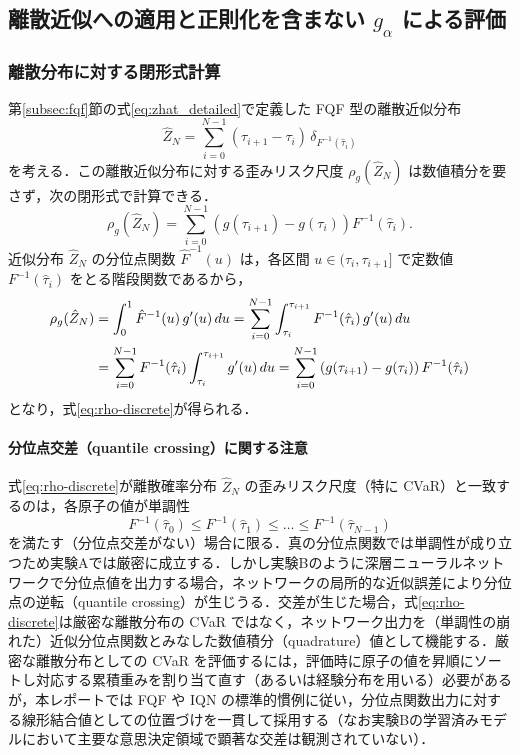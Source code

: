 \documentclass[a4paper,10pt]{jsarticle}
\theoremstyle{definition}
\renewcommand{\Finv}{F^{-1}}
\newcommand{\Fhinv}{\hat{F}^{-1}}
\begin{document}
\subsection{離散近似への適用と正則化を含まない $g_\alpha$ による評価}
\label{subsec:discrete-eval}

\subsubsection{離散分布に対する閉形式計算}
第\ref{subsec:fqf}節の式\eqref{eq:zhat_detailed}で定義した FQF 型の離散近似分布
\begin{equation}
  \hat Z_N = \sum_{i=0}^{N-1}(\tau_{i+1}-\tau_i)\,\delta_{\Finv(\hat\tau_i)}
\end{equation}
を考える．この離散近似分布に対する歪みリスク尺度 $\rho_g(\hat Z_N)$ は数値積分を要さず，次の閉形式で計算できる．
\begin{equation}
  \rho_g(\hat Z_N) = \sum_{i=0}^{N-1}\left(g(\tau_{i+1}) - g(\tau_i)\right)\Finv(\hat\tau_i).
  \label{eq:rho-discrete}
\end{equation}
近似分布 $\hat Z_N$ の分位点関数 $\Fhinv(u)$ は，各区間 $u \in (\tau_i, \tau_{i+1}]$ で定数値 $\Finv(\hat\tau_i)$ をとる階段関数であるから，
\begin{align}
  \rho_g(\hat Z_N)
  &= \int_0^1 \Fhinv(u)\,g'(u)\,du = \sum_{i=0}^{N-1} \int_{\tau_i}^{\tau_{i+1}} \Finv(\hat\tau_i)\,g'(u)\,du \notag\\
  &= \sum_{i=0}^{N-1} \Finv(\hat\tau_i) \int_{\tau_i}^{\tau_{i+1}} g'(u)\,du = \sum_{i=0}^{N-1} \left(g(\tau_{i+1}) - g(\tau_i)\right)\Finv(\hat\tau_i)
\end{align}
となり，式\eqref{eq:rho-discrete}が得られる．

\paragraph{分位点交差（quantile crossing）に関する注意}
式\eqref{eq:rho-discrete}が離散確率分布 $\hat Z_N$ の歪みリスク尺度（特に CVaR）と一致するのは，各原子の値が単調性
\begin{equation*}
  \Finv(\hat\tau_0) \le \Finv(\hat\tau_1) \le \dots \le \Finv(\hat\tau_{N-1})
\end{equation*}
を満たす（分位点交差がない）場合に限る．真の分位点関数では単調性が成り立つため実験Aでは厳密に成立する．しかし実験Bのように深層ニューラルネットワークで分位点値を出力する場合，ネットワークの局所的な近似誤差により分位点の逆転（quantile crossing）が生じうる．交差が生じた場合，式\eqref{eq:rho-discrete}は厳密な離散分布の CVaR ではなく，ネットワーク出力を（単調性の崩れた）近似分位点関数とみなした数値積分（quadrature）値として機能する．厳密な離散分布としての CVaR を評価するには，評価時に原子の値を昇順にソートし対応する累積重みを割り当て直す（あるいは経験分布を用いる）必要があるが，本レポートでは FQF や IQN の標準的慣例に従い，分位点関数出力に対する線形結合値としての位置づけを一貫して採用する（なお実験Bの学習済みモデルにおいて主要な意思決定領域で顕著な交差は観測されていない）．
\end{document}
